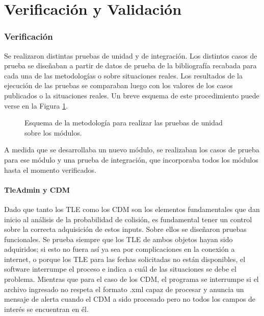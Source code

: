 \section{Verificaci\'on y Validaci\'on}\label{sec:vandv}

\subsubsection*{Verificaci\'on}
Se realizaron distintas pruebas de unidad y de integraci\'on.  
Los distintos casos de prueba se diseñaban a partir de datos de prueba de la bibliograf\'ia recabada para cada una de las metodolog\'ias o sobre situaciones reales. Los resultados de la ejecución de las pruebas se comparaban luego con los valores de los casos publicados o la situaciones reales. Un breve esquema de este procedimiento puede verse en la Figura \ref{fig:metodoprueba}. 

\begin{figure}[h!]
  \centering
  \caption{Esquema de la metodología para realizar las pruebas de unidad sobre los módulos.}
  \label{fig:metodoprueba}
\end{figure}

A medida que se desarrollaba un nuevo m\'odulo, se realizaban los casos de prueba para ese m\'odulo y una prueba de integraci\'on, que incorporaba todos los m\'odulos hasta el momento verificados.

\paragraph*{TleAdmin y CDM}
Dado que tanto los TLE como los CDM son los elementos fundamentales que dan inicio al an\'alisis de la probabilidad de colisi\'on, es fundamental tener un control sobre la correcta adquisici\'on de estos inputs. Sobre ellos se diseñaron pruebas funcionales. Se prueba siempre que los TLE de ambos objetos hayan sido adquiridos; si esto no fuera as\'i ya sea por complicaciones en la conexi\'on a internet, o porque los TLE para las fechas solicitadas no est\'an disponibles, el software interrumpe el proceso e indica a cu\'al de las situaciones se debe el problema. Mientras que para el caso de los CDM, el programa se interrumpe si el archivo ingresado no respeta el formato .xml capaz de procesar y anuncia un mensaje de alerta cuando el CDM a sido procesado pero no todos los campos de inter\'es se encuentran en \'el. 

